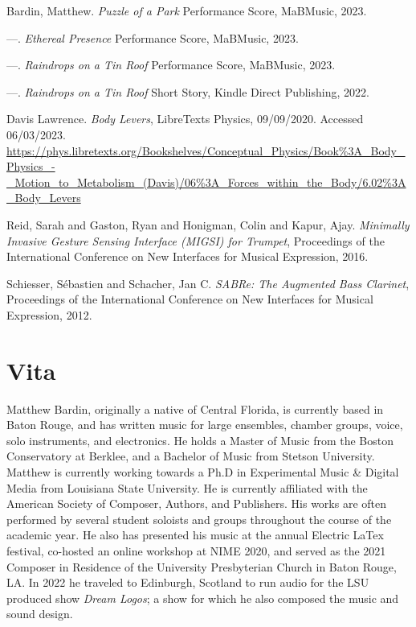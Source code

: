 \begin{thebibliography}{99}

 Bardin, Matthew. \emph{Puzzle of a Park} Performance Score, MaBMusic, 2023.

 ---. \emph{Ethereal Presence} Performance Score, MaBMusic, 2023.

 ---. \emph{Raindrops on a Tin Roof} Performance Score, MaBMusic, 2023.

 ---. \emph{Raindrops on a Tin Roof} Short Story, Kindle Direct Publishing, 2022.

 Davis Lawrence. \emph{Body Levers}, LibreTexts Physics, 09/09/2020. Accessed 06/03/2023. \url{https://phys.libretexts.org/Bookshelves/Conceptual_Physics/Book%3A_Body_Physics_-_Motion_to_Metabolism_(Davis)/06%3A_Forces_within_the_Body/6.02%3A_Body_Levers}

 Reid, Sarah and Gaston, Ryan and Honigman, Colin and Kapur, Ajay. \emph{Minimally Invasive Gesture Sensing Interface (MIGSI) for Trumpet}, Proceedings of the International Conference on New Interfaces for Musical Expression, 2016.

 Schiesser, S{\'e}bastien and Schacher, Jan C. \emph{SABRe: The Augmented Bass Clarinet}, Proceedings of the International Conference on New Interfaces for Musical Expression, 2012.






\end{thebibliography}


\chapter{Vita}

Matthew Bardin, originally a native of Central Florida, is currently based in Baton Rouge, and has written music for large ensembles, chamber groups, voice, solo instruments, and electronics. He holds a Master of Music from the Boston Conservatory at Berklee, and a  Bachelor of Music from Stetson University. Matthew is currently working towards a Ph.D in Experimental Music \& Digital Media from Louisiana State University. He is currently affiliated with the American Society of Composer, Authors, and Publishers. His works are often performed by several student soloists and groups throughout the course of the academic year. He also has presented his music at the annual Electric LaTex festival, co-hosted an online workshop at NIME 2020, and served as the 2021 Composer in Residence of the University Presbyterian Church in Baton Rouge, LA. In 2022 he traveled to Edinburgh, Scotland to run audio for the LSU produced show \textit{Dream Logos}; a show for which he also composed the music and sound design.

